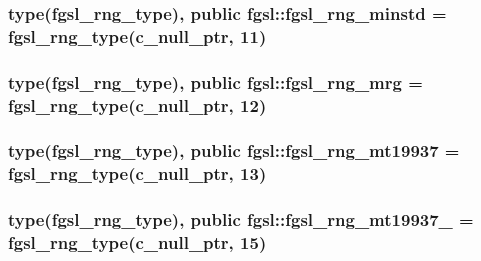 \subsubsection[{fgsl\+\_\+rng\+\_\+minstd}]{\setlength{\rightskip}{0pt plus 5cm}type({\bf fgsl\+\_\+rng\+\_\+type}), public fgsl\+::fgsl\+\_\+rng\+\_\+minstd = {\bf fgsl\+\_\+rng\+\_\+type}(c\+\_\+null\+\_\+ptr, 11)}\label{namespacefgsl_a9bc7cd5586595c2ac502e3f6496869a9}
\hypertarget{namespacefgsl_a598ecc30ecba7ed571bf0d76f66cc23f}{}
\subsubsection[{fgsl\+\_\+rng\+\_\+mrg}]{\setlength{\rightskip}{0pt plus 5cm}type({\bf fgsl\+\_\+rng\+\_\+type}), public fgsl\+::fgsl\+\_\+rng\+\_\+mrg = {\bf fgsl\+\_\+rng\+\_\+type}(c\+\_\+null\+\_\+ptr, 12)}\label{namespacefgsl_a598ecc30ecba7ed571bf0d76f66cc23f}
\hypertarget{namespacefgsl_ac85f5a9aab93968683416a0bf672122d}{}
\subsubsection[{fgsl\+\_\+rng\+\_\+mt19937}]{\setlength{\rightskip}{0pt plus 5cm}type({\bf fgsl\+\_\+rng\+\_\+type}), public fgsl\+::fgsl\+\_\+rng\+\_\+mt19937 = {\bf fgsl\+\_\+rng\+\_\+type}(c\+\_\+null\+\_\+ptr, 13)}\label{namespacefgsl_ac85f5a9aab93968683416a0bf672122d}
\hypertarget{namespacefgsl_a984a8a295a9ec6b581b70421f780df53}{}
\subsubsection[{fgsl\+\_\+rng\+\_\+mt19937\+\_\+1998}]{\setlength{\rightskip}{0pt plus 5cm}type({\bf fgsl\+\_\+rng\+\_\+type}), public fgsl\+::fgsl\+\_\+rng\+\_\+mt19937\+\_ = {\bf fgsl\+\_\+rng\+\_\+type}(c\+\_\+null\+\_\+ptr, 15)}\label{namespacefgsl_a984a8a295a9ec6b581b70421f780df53}
\hypertarget{namespacefgsl_a9e349dde1852d8ef9eb4bbdcc9de661a}{}
